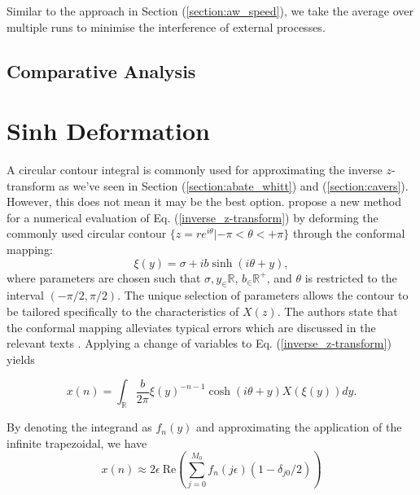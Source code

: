 \documentclass[a4paper]{report}
\begin{document}
Similar to the approach in Section (\ref{section:aw_speed}), we take the average over multiple runs to minimise the interference of external processes.

\subsection{Comparative Analysis}

\section{Sinh Deformation}\label{section:sinh_deformation}
A circular contour integral is commonly used for approximating the inverse $z$-transform as we've seen in Section (\ref{section:abate_whitt}) and (\ref{section:cavers}). However, this does not mean it may be the best option. \citet{levendorskii2022sinh} propose a new method for a numerical evaluation of Eq. (\ref{inverse_z-transform}) by deforming the commonly used circular contour $\{z = re^{i\theta} | -\pi < \theta < +\pi\}$ through the conformal mapping:
\begin{equation}\label{equation:conformal_mapping}
    \xi(y) = \sigma + ib\sinh(i\theta + y),
\end{equation}
where parameters are chosen such that $\sigma,y_\in \mathbb{R}$, $b_\in \mathbb{R}^+$, and $\theta$ is restricted to the interval $(-\pi/2, \pi / 2)$. The unique selection of parameters allows the contour to be tailored specifically to the characteristics of $X(z)$. The authors state that the conformal mapping alleviates typical errors which are discussed in the relevant texts \citep{boyarchenko2014efficient, boyarchenko2019sinh, schmelzer2007computing}.  Applying a change of variables to Eq. (\ref{inverse_z-transform}) yields

\begin{equation}
    x(n) = \int_\mathbb{R} \frac{b}{2\pi} \xi(y)^{-n-1} \cosh(i\theta + y) X(\xi(y)) dy.
\end{equation}

By denoting the integrand as $f_n(y)$ and approximating the application of the infinite trapezoidal, we have 
\begin{equation}
    x(n) \approx 2 \epsilon\ \text{Re}\left( \sum_{j = 0}^{M_0} f_n(j \epsilon)(1 - \delta_{j0}/2) \right)
\end{equation}
\end{document}
